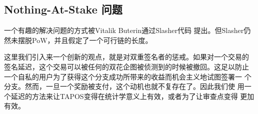 \documentclass[letterpaper]{article}
\begin{document}

\subsection{Nothing-At-Stake 问题}
一个有趣的解决问题的方式被Vitalik Buterin通过Slasher\cite{Slasher}代码
提出。但Slasher仍然未摆脱PoW，并且假定了一个可行链的长度。

这里我们引入来一个创新的观点，就是对双重签名者的惩戒。如果对一个交易的
签名延迟，这个交易可以被任何的双花企图被侦测到的时候被撤回。这足以防止
一个自私的用户为了获得这个分支成功所带来的收益而机会主义地试图签署一
个分支。然而，一旦一个奖励被支付，这个动机也就不复存在了。因此我们使
用一个延迟的方法来让TAPOS变得在统计学意义上有效，或者为了让审查点变得
更加有效。
\end{document}
